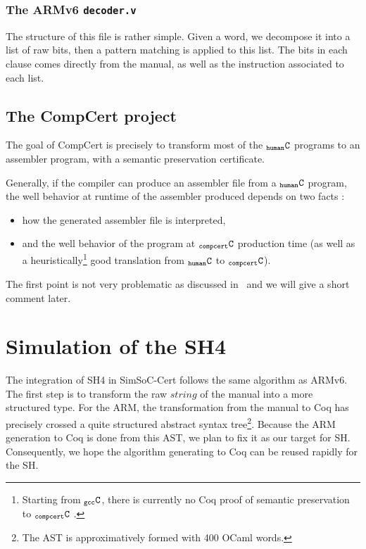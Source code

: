 \documentclass[a4paper, 11pt]{article}
\newcommand{\ccert}{CompCert\xspace}
\newcommand{\C}{$_{\tt compcert}{\tt C}$\xspace}
\newcommand{\gccC}{$_{\tt gcc}{\tt C}$\xspace}
\newcommand{\hC}{$_{\tt human}{\tt C}$\xspace}
\newcommand{\SScert}{SimSoC-Cert\xspace}
\begin{document}
\subsubsection{The ARMv6 {\tt decoder.v}}
The structure of this file is rather simple. Given a word, we decompose it into a list of raw bits, then a pattern matching is applied to this list. The bits in each clause comes directly from the manual, as well as the instruction associated to each list.
\subsection{The \ccert project}
The goal of \ccert is precisely to transform most of the \hC programs to an assembler program, with a semantic preservation certificate. 

Generally, if the compiler can produce an assembler file from a \hC program, the well behavior at runtime of the assembler produced depends on two facts :
\begin{itemize}
\item how the generated assembler file is interpreted,
\item and the well behavior of the program at \C production time (as well as a heuristically\footnote{Starting from \gccC, there is currently no Coq proof of semantic preservation to \C%
. } good translation from \hC to \C).
\end{itemize}
The first point is not very problematic as discussed in~\cite{Leroy-Compcert-CACM} and we will give a short comment later.

\section{Simulation of the SH4}
\label{s:simu_sh4}

The integration of SH4 in \SScert follows the same algorithm as ARMv6. The first step is to transform the raw $string$ of the manual into a more structured type. For the ARM, the transformation from the manual to Coq has precisely crossed a quite structured abstract syntax tree\footnote{The AST is approximatively formed with 400 OCaml words.}. Because the ARM generation to Coq is done from this AST, we plan to fix it as our target for SH. Consequently, we hope the algorithm generating to Coq can be reused rapidly for the SH.

\hspace{1ex}
\end{document}
